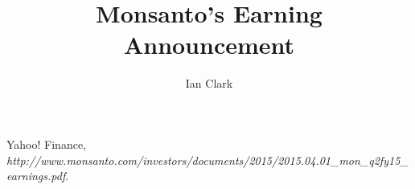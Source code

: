 \documentclass[11pt,letterpaper,english]{article}
\title{Monsanto's Earning Announcement}
\author{Ian Clark}
\date{}
\begin{document}
\maketitle

\newpage
\begin{thebibliography}{9}
    Yahoo! Finance,
    \emph{http://www.monsanto.com/investors/documents/2015/2015.04.01_mon_q2fy15_earnings.pdf}.
\end{thebibliography}
\end{document}
